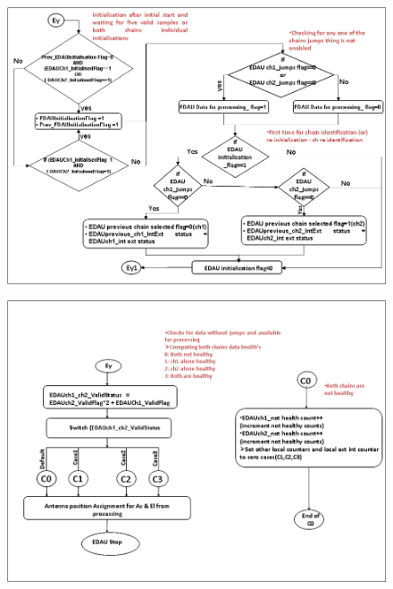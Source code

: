 \begin{figure}[H]
	\centering
	\includegraphics[width=\linewidth]{./FlowCharts/PngFlowCharts/EDAU4.png}
\end{figure}


\begin{figure}[H]
	\centering
	\includegraphics[width=\linewidth]{./FlowCharts/PngFlowCharts/EDAU5.png}
\end{figure}


